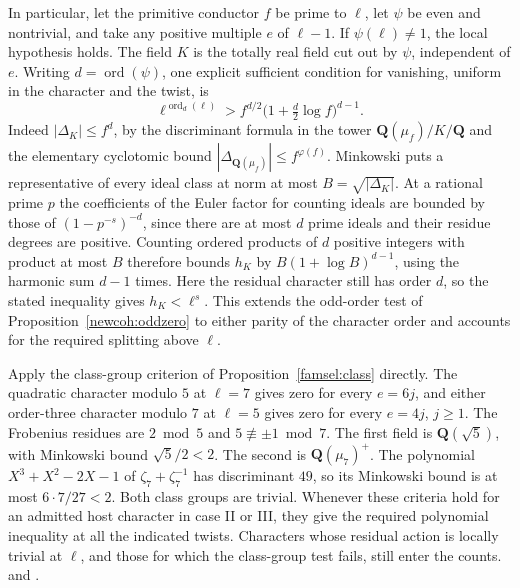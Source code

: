 In particular, let the primitive conductor \(f\) be prime to \(\ell\),
let \(\psi\) be even and nontrivial, and take any positive multiple
\(e\) of \(\ell-1\). If \(\psi(\ell)\ne1\), the local hypothesis holds.
The field \(K\) is the totally real field cut out by \(\psi\), independent
of \(e\). Writing \(d=\operatorname{ord}(\psi)\), one explicit sufficient
condition for vanishing, uniform in the character and the twist, is
\[
        \ell^{\operatorname{ord}_d(\ell)}>
              f^{d/2}\bigl(1+\tfrac d2\log f\bigr)^{d-1}.
\]
Indeed \(|\Delta_K|\le f^d\), by the discriminant formula in the tower
\(\mathbf Q(\mu_f)/K/\mathbf Q\) and the elementary cyclotomic bound
\(|\Delta_{\mathbf Q(\mu_f)}|\le f^{\varphi(f)}\).
Minkowski puts a representative of every ideal class at norm at most
\(B=\sqrt{|\Delta_K|}\). At a rational prime \(p\) the coefficients of
the Euler factor for counting ideals are bounded by those of
\((1-p^{-s})^{-d}\), since there are at most \(d\) prime ideals and
their residue degrees are positive. Counting ordered products of \(d\)
positive integers with product at most \(B\) therefore bounds \(h_K\)
by \(B(1+\log B)^{d-1}\), using the harmonic sum \(d-1\) times.
Here the residual character still has order \(d\), so the stated
inequality gives \(h_K<\ell^s\). This extends the odd-order test of
Proposition~\ref{newcoh:oddzero} to either parity of the character
order and accounts for the required splitting above \(\ell\).

Apply the class-group criterion of Proposition~\ref{famsel:class} directly. The quadratic character modulo \(5\) at \(\ell=7\)
gives zero for every \(e=6j\), and either order-three character
modulo \(7\) at \(\ell=5\) gives zero for every \(e=4j\), \(j\ge1\).
The Frobenius residues are \(2\bmod5\) and \(5\not\equiv\pm1\bmod7\).
The first field is \(\mathbf Q(\sqrt5)\), with Minkowski bound
\(\sqrt5/2<2\). The second is \(\mathbf Q(\mu_7)^+\).
The polynomial \(X^3+X^2-2X-1\) of \(\zeta_7+\zeta_7^{-1}\)
has discriminant \(49\), so its Minkowski bound is at most
\(6\cdot7/27<2\). Both class groups are trivial.
Whenever these criteria hold for an admitted host character in case II
or III, they give the required polynomial inequality at all the indicated
twists. Characters whose residual action is locally trivial at \(\ell\),
and those for which the class-group test fails, still enter the counts.
and .

